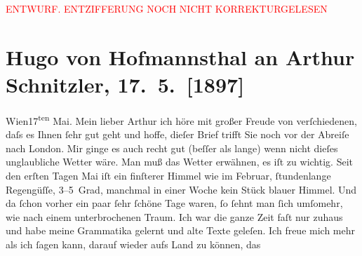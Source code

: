 
\begin{center}
            \textcolor{red}{ENTWURF. ENTZIFFERUNG NOCH NICHT KORREKTURGELESEN}
                      \end{center}
            
               \section[Hugo von Hofmannsthal an Arthur Schnitzler, 17. 5. {[}1897{]}]{ Hugo von Hofmannsthal an Arthur Schnitzler, 17. 5. {[}1897{]}}\nopagebreak{}\rehead{ }\begin{ledgroupsized}[t]{13cm}\normalsize\beginnumbering{} \toendnotes[C]{\smallbreak\pagebreak[2]} 
\pstart
           \raggedleft{}{\pb}Wien17\textsuperscript{ten} Mai.\pend
           \pstart{}Mein lieber Arthur\pend\pstart
           ich höre mit großer Freude von verſchiedenen, daſs es Ihnen ſehr gut  geht und hoffe, dieſer Brief trifft Sie noch
                    vor der Abreiſe nach London. Mir ginge es auch
                    recht gut (beſſer als lange) wenn nicht dieſes unglaubliche Wetter wäre. Man muß
                    das Wetter erwähnen, es iſt {\pb}zu wichtig. Seit den erſten Tagen Mai iſt ein finſterer Himmel
                    wie im Februar, ſtundenlange Regengüſſe, 3–5 Grad, manchmal in einer Woche kein
                    Stück blauer Himmel. Und da ſchon vorher ein paar ſehr ſchöne Tage waren, ſo
                    ſehnt man ſich umſomehr, wie nach einem unterbrochenen Traum. Ich war die ganze
                    Zeit faſt nur zuhaus und habe meine Grammatika gelernt {\pb}und alte Texte geleſen. Ich
                    freue mich mehr als ich ſagen kann, darauf wieder aufs Land zu können, das

\end{ledgroupsized}
